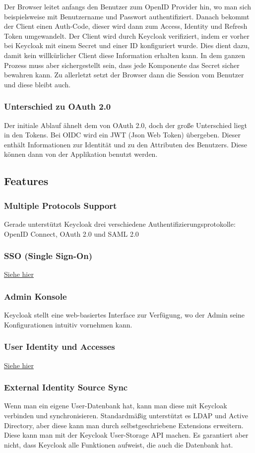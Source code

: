 Der Browser leitet anfangs den Benutzer zum OpenID Provider hin, wo man sich beispielsweise mit Benutzername und Passwort authentifiziert.
Danach bekommt der Client einen Auth-Code, dieser wird dann zum Access, Identity und Refresh Token umgewandelt.
Der Client wird durch Keycloak verifiziert, indem er vorher bei Keycloak mit einem Secret und einer ID konfiguriert wurde. Dies dient dazu, damit kein willkürlicher Client diese Information erhalten kann.
In dem ganzen Prozess muss aber sichergestellt sein, dass jede Komponente das Secret sicher bewahren kann.
Zu allerletzt setzt der Browser dann die Session vom Benutzer und diese bleibt auch. \cite{KeycloakCodeCentric}

\subsubsection{Unterschied zu OAuth 2.0}
Der initiale Ablauf ähnelt dem von OAuth 2.0, doch der große Unterschied liegt in den Tokens.
Bei OIDC wird ein JWT (Json Web Token) übergeben. Dieser enthält Informationen zur Identität und zu den Attributen des Benutzers.
Diese können dann von der Applikation benutzt werden. \cite{KeycloakCodeCentric}


\subsection{Features}
\subsubsection{Multiple Protocols Support}
Gerade unterstützt Keycloak drei verschiedene Authentifizierungsprotokolle: OpenID Connect, OAuth 2.0 und SAML 2.0 \cite{KeyCloakDZone}
\subsubsection{SSO (Single Sign-On)}
\hyperref[sec:SSO]{Siehe hier}
\subsubsection{Admin Konsole}
Keycloak stellt eine web-basiertes Interface zur Verfügung, wo der Admin seine Konfigurationen intuitiv vornehmen kann. \cite{KeyCloakDZone}
\subsubsection{User Identity und Accesses}
\hyperref[sec:IAM]{Siehe hier}
\subsubsection{External Identity Source Sync}
Wenn man ein eigene User-Datenbank  hat, kann man diese mit Keycloak verbinden und synchronisieren. Standardmäßig unterstützt es LDAP und Active Directory, aber diese
kann man durch selbstgeschriebene Extensions erweitern. Diese kann man mit der Keycloak User-Storage API machen. Es garantiert aber nicht, dass Keycloak alle Funktionen aufweist,
die auch die Datenbank hat. \cite{KeyCloakDZone}
